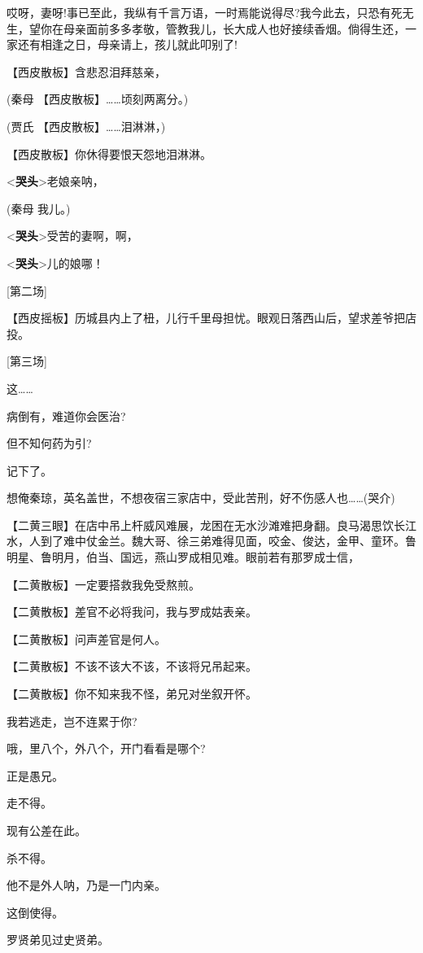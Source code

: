 哎呀，妻呀!事已至此，我纵有千言万语，一时焉能说得尽?我今此去，只恐有死无生，望你在母亲面前多多孝敬，管教我儿，长大成人也好接续香烟。倘得生还，一家还有相逢之日，母亲请上，孩儿就此叩别了!

【西皮散板】含悲忍泪拜慈亲，

(秦母 【西皮散板】\ldots{}\ldots{}顷刻两离分。)

(贾氏 【西皮散板】\ldots{}\ldots{}泪淋淋，)

【西皮散板】你休得要恨天怨地泪淋淋。

\textless{}\textbf{哭头}\textgreater{}老娘亲呐，

(秦母 我儿。)

\textless{}\textbf{哭头}\textgreater{}受苦的妻啊，啊，

\textless{}\textbf{哭头}\textgreater{}儿的娘哪！

{[}第二场{]}

【西皮摇板】历城县内上了杻，儿行千里母担忧。眼观日落西山后，望求差爷把店投。

{[}第三场{]}

这\ldots{}\ldots{}

病倒有，难道你会医治?

但不知何药为引?

记下了。

想俺秦琼，英名盖世，不想夜宿三家店中，受此苦刑，好不伤感人也\ldots{}\ldots{}(哭介)

【二黄三眼】在店中吊上杆威风难展，龙困在无水沙滩难把身翻。良马渴思饮长江水，人到了难中仗金兰。魏大哥、徐三弟难得见面，咬金、俊达，金甲、童环。鲁明星、鲁明月，伯当、国远，燕山罗成相见难。眼前若有那罗成士信，

【二黄散板】一定要搭救我免受熬煎。

【二黄散板】差官不必将我问，我与罗成姑表亲。

【二黄散板】问声差官是何人。

【二黄散板】不该不该大不该，不该将兄吊起来。

【二黄散板】你不知来我不怪，弟兄对坐叙开怀。

我若逃走，岂不连累于你?

哦，里八个，外八个，开门看看是哪个?

正是愚兄。

走不得。

现有公差在此。

杀不得。

他不是外人呐，乃是一门内亲。

这倒使得。

罗贤弟见过史贤弟。

